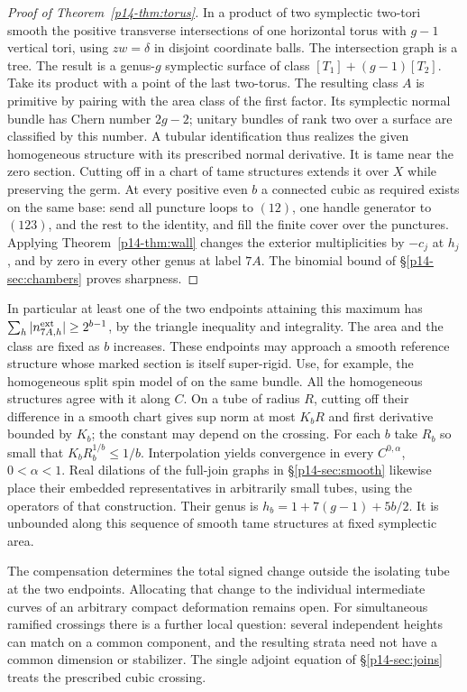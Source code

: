 \begin{proof}[Proof of Theorem~\ref{p14-thm:torus}]
In a product of two symplectic two-tori smooth the positive transverse
intersections of one horizontal torus with \(g-1\) vertical tori,
using \(zw=\delta\) in disjoint coordinate balls. The intersection
graph is a tree. The result is a genus-\(g\) symplectic surface of
class \([T_1]+(g-1)[T_2]\). Take its product with a point of the last
two-torus. The resulting class \(A\) is primitive by pairing with
the area class of the first factor. Its symplectic normal bundle has
Chern number \(2g-2\); unitary bundles of rank two over a surface are
classified by this number. A tubular identification thus realizes the
given homogeneous structure with its prescribed normal derivative.
It is tame near the zero section. Cutting off in a chart of tame
structures extends it over \(X\) while preserving the germ. At every
positive even \(b\) a connected cubic as required exists on the same
base: send all puncture loops to \((12)\), one handle generator to
\((123)\), and the rest to the identity, and fill the finite cover
over the punctures. Applying Theorem~\ref{p14-thm:wall} changes the
exterior multiplicities by \(-c_j\) at \(h_j\), and by zero in every
other genus at label \(7A\). The binomial bound of
\S\ref{p14-sec:chambers} proves sharpness.
\end{proof}

In particular at least one of the two endpoints attaining this
maximum has \(\sum_h|n^{\rm ext}_{7A,h}|\geq2^{b-1}\), by the
triangle inequality and integrality. The area and the class are fixed
as \(b\) increases. These endpoints may approach a smooth reference
structure whose marked section is itself super-rigid. Use, for example,
the homogeneous split spin model of \cite[Lemma~14.1]{WueUnramified} on the
same bundle. All the homogeneous structures agree with it along
\(C\). On a tube of radius \(R\), cutting off their difference in a
smooth chart gives sup norm at most \(K_b R\) and first derivative
bounded by \(K_b\); the constant may depend on the crossing. For each
\(b\) take \(R_b\) so small that \(K_b R_b^{1/b}\leq 1/b\).
Interpolation yields convergence in every \(C^{0,\alpha}\),
\(0<\alpha<1\). Real dilations of the full-join graphs in
\S\ref{p14-sec:smooth} likewise place their embedded representatives
in arbitrarily small tubes, using the operators of that construction.
Their genus is \(h_b=1+7(g-1)+5b/2\). It is unbounded along this
sequence of smooth tame structures at fixed symplectic area.

\smallskip
The compensation determines the total signed change outside the
isolating tube at the two endpoints. Allocating that change to the
individual intermediate curves of an arbitrary compact deformation
remains open. For simultaneous ramified crossings there is a further
local question: several independent heights can match on a common
component, and the resulting strata need not have a common
dimension or stabilizer. The single adjoint equation of
\S\ref{p14-sec:joins} treats the prescribed cubic crossing.
